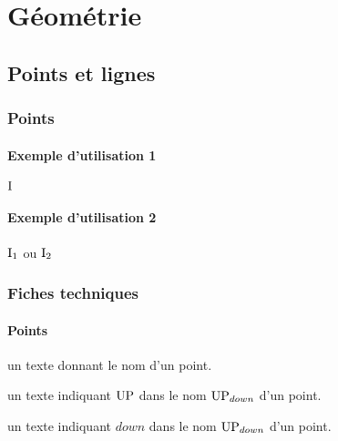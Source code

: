 \documentclass[12pt,a4paper]{article}
\begin{document}
\section{Géométrie}

\subsection{Points et lignes}

\subsubsection{Points}

\paragraph{Exemple d'utilisation 1}

\begin{latexex}
$\pt{I}$
\end{latexex}




\paragraph{Exemple d'utilisation 2}

\begin{latexex}
$\pt*{I}{1}$ ou
$\pt*{I}{2}$
\end{latexex}




\subsubsection{Fiches techniques}

\paragraph{Points}


\IDarg{} un texte donnant le nom d'un point.


\separation



 un texte indiquant $\pt{UP}$ dans le nom $\pt*{UP}{down}$ d'un point.

 un texte indiquant $down$ dans le nom $\pt*{UP}{down}$ d'un point.


\end{document}
